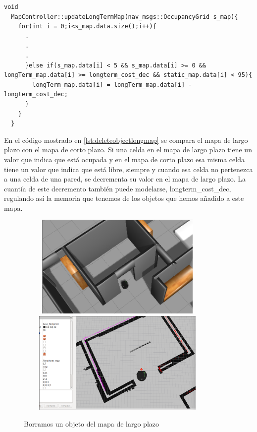 \begin{lstlisting}[caption=Procedimiento para eliminar un objeto al mapa de largo plazo, label={lst:deleteobjectlongmap}]
  void
  MapController::updateLongTermMap(nav_msgs::OccupancyGrid s_map){
    for(int i = 0;i<s_map.data.size();i++){
      .
      .
      .
      }else if(s_map.data[i] < 5 && s_map.data[i] >= 0 && longTerm_map.data[i] >= longterm_cost_dec && static_map.data[i] < 95){
        longTerm_map.data[i] = longTerm_map.data[i] - longterm_cost_dec;
      }
    }
  } 

\end{lstlisting}

En el código mostrado en \ref{lst:deleteobjectlongmap} se compara el mapa de largo plazo con el mapa de corto plazo. Si una celda en el mapa de largo plazo tiene un valor que indica que está ocupada y en el mapa de corto plazo esa misma celda tiene un valor que indica que está libre, siempre y cuando esa celda no pertenezca a una celda de una pared, se decrementa su valor en el mapa de largo plazo. La cuantía de este decremento también puede modelarse, longterm\_cost\_dec, regulando así la memoria que tenemos de los objetos que hemos añadido a este mapa.\\

\begin{figure}[H]
  \begin{center}
    \includegraphics[width=10cm,height=5cm]{img/cap5/deletingobject-gazebo}
    \includegraphics[width=10cm,height=5cm]{img/cap5/deletingobject-longmap}
  \end{center}
  \caption{Borramos un objeto del mapa de largo plazo}
  \label{fig:deleteobjectlongmap}
\end{figure}

